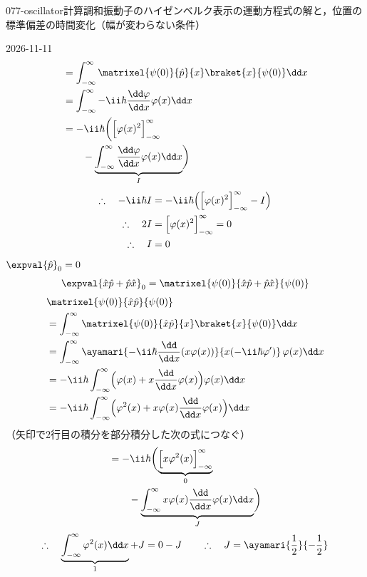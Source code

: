 \documentclass[uplatex,dvipdfmx,a4paper,11pt]{jsarticle}
\begin{document}
\begin{mondai}{077-oscillator}{計算}{調和振動子のハイゼンベルク表示の運動方程式の解と，位置の標準偏差の時間変化（幅が変わらない条件）}
\begin{kotaeutsushi}{2026-11-11}
\begin{align*}
&=\int_{-\infty}^{\infty}\matrixel{\psi(0)}{\hat{p}}{x}\braket{x}{\psi(0)}\dd x\\
&=\int_{-\infty}^{\infty}-\ii\hbar\frac{\dd\varphi}{\dd x}\varphi(x)\dd x\\
&=-\ii\hbar\biggl(\Bigl[\varphi(x)^{2}\Bigr]_{-\infty}^{\infty}\\
&\qquad-\underbrace{\int_{-\infty}^{\infty}\frac{\dd\varphi}{\dd x}\varphi(x)\dd x}_{I}\biggr)
\end{align*}
\begin{align*}
\therefore\quad-\ii\hbar I&=-\ii\hbar\Bigl(\Bigl[\varphi(x)^{2}\Bigr]_{-\infty}^{\infty}-I\Bigr)\\
\therefore\quad2I&=\Bigl[\varphi(x)^{2}\Bigr]_{-\infty}^{\infty}=0\\
\therefore\quad I&=0
\end{align*}
$\expval{\hat{p}}_{0}=0$
\[ \expval{\hat{x}\hat{p}+\hat{p}\hat{x}}_{0}=\matrixel{\psi(0)}{\hat{x}\hat{p}+\hat{p}\hat{x}}{\psi(0)} \]
\begin{align*}
&\matrixel{\psi(0)}{\hat{x}\hat{p}}{\psi(0)}\\
&=\int_{-\infty}^{\infty}\matrixel{\psi(0)}{\hat{x}\hat{p}}{x}\braket{x}{\psi(0)}\dd x\\
&=\int_{-\infty}^{\infty}\ayamari{-\ii\hbar\frac{\dd}{\dd x}(x\varphi(x))}{x(-\ii\hbar\varphi')}\,\varphi(x)\dd x\\
&=-\ii\hbar\int_{-\infty}^{\infty}\Bigl(\varphi(x)+x\frac{\dd}{\dd x}\varphi(x)\Bigr)\varphi(x)\dd x\\
&=-\ii\hbar\int_{-\infty}^{\infty}\Bigl(\varphi^{2}(x)+x\varphi(x)\frac{\dd}{\dd x}\varphi(x)\Bigr)\dd x
\end{align*}
（矢印で2行目の積分を部分積分した次の式につなぐ）
\begin{align*}
&=-\ii\hbar\biggl(\underbrace{\Bigl[x\varphi^{2}(x)\Bigr]_{-\infty}^{\infty}}_{0}\\
&\qquad-\underbrace{\int_{-\infty}^{\infty}x\varphi(x)\frac{\dd}{\dd x}\varphi(x)\dd x}_{J}\biggr)
\end{align*}
\[ \therefore\quad\underbrace{\int_{-\infty}^{\infty}\varphi^{2}(x)\dd x}_{1}+J=0-J\qquad\therefore\quad J=\ayamari{\frac{1}{2}}{-\frac{1}{2}} \]

\end{kotaeutsushi}
\end{mondai}
\end{document}
